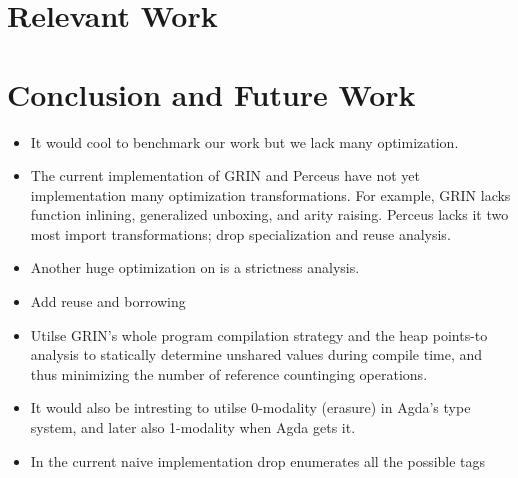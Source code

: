 \documentclass[10pt, twocolumn]{article}
\begin{document}
\section{Relevant Work}

\section{Conclusion and Future Work}
\begin{itemize}
\item It would cool to benchmark our work but we lack many optimization.
\item The current implementation of GRIN and Perceus have not yet implementation many optimization transformations. For example, GRIN lacks function inlining, generalized unboxing, and arity raising. Perceus lacks it two most import transformations; drop specialization and reuse analysis.
\item Another huge optimization on is a strictness analysis. 
\item Add reuse and borrowing
\item Utilse GRIN's whole program compilation strategy and the heap points-to analysis to statically determine unshared values during compile time, and thus minimizing the number of reference countinging operations.
\item It would also be intresting to utilse 0-modality (erasure) in Agda's type system, and later also 1-modality when Agda gets it.
\item In the current naive implementation drop enumerates all the possible tags 
\end{itemize}



\printbibliography

\end{document}
